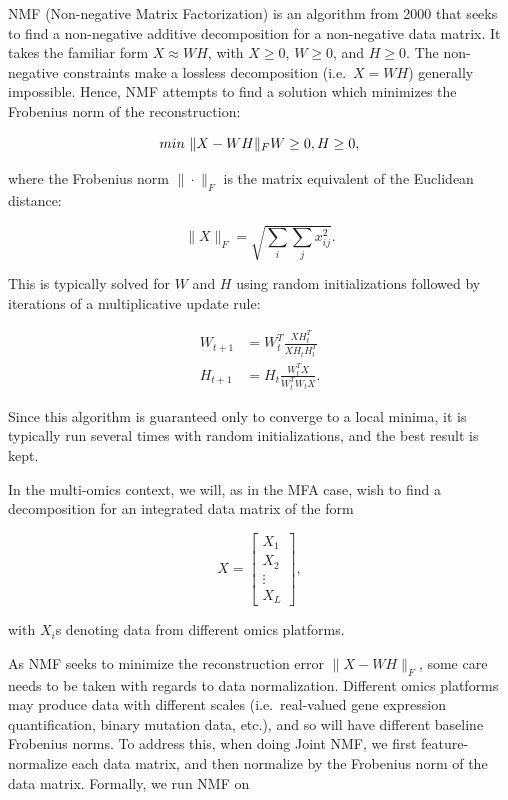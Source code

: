 \documentclass[12pt,]{krantz}
\begin{document}
NMF (Non-negative Matrix Factorization) is an algorithm from 2000 that seeks to find a non-negative additive decomposition for a non-negative data matrix. It takes the familiar form \(X \approx WH\), with \(X \ge 0\), \(W \ge 0\), and \(H \ge 0\). The non-negative constraints make a lossless decomposition (i.e.~\(X=WH\)) generally impossible. Hence, NMF attempts to find a solution which minimizes the Frobenius norm of the reconstruction:

\[
min~\|X-WH\|_F \\
W \ge 0, \\
H \ge 0,
\]

where the Frobenius norm \(\|\cdot\|_F\) is the matrix equivalent of the Euclidean distance:

\[
\|X\|_F = \sqrt{\sum_i\sum_jx_{ij}^2}.
\]

This is typically solved for \(W\) and \(H\) using random initializations followed by iterations of a multiplicative update rule:

\begin{align}
    W_{t+1} &= W_t^T \frac{XH_t^T}{XH_tH_t^T} \\
    H_{t+1} &= H_t \frac{W_t^TX}{W^T_tW_tX}.
\end{align}

Since this algorithm is guaranteed only to converge to a local minima, it is typically run several times with random initializations, and the best result is kept.

In the multi-omics context, we will, as in the MFA case, wish to find a decomposition for an integrated data matrix of the form

\[
X = \begin{bmatrix}
    X_{1} \\
    X_{2} \\
    \vdots \\
    X_{L}
\end{bmatrix},
\]

with \(X_i\)s denoting data from different omics platforms.

As NMF seeks to minimize the reconstruction error \(\|X-WH\|_F\), some care needs to be taken with regards to data normalization. Different omics platforms may produce data with different scales (i.e.~real-valued gene expression quantification, binary mutation data, etc.), and so will have different baseline Frobenius norms. To address this, when doing Joint NMF, we first feature-normalize each data matrix, and then normalize by the Frobenius norm of the data matrix. Formally, we run NMF on
\end{document}
